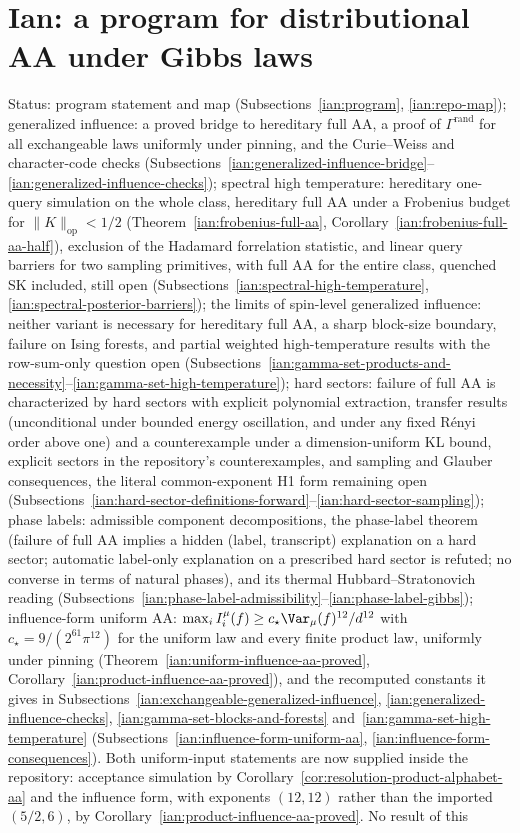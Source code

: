 \section{Ian: a program for distributional AA under Gibbs laws}\label{ian:section}

Status: program statement and map (Subsections~\ref{ian:program}, \ref{ian:repo-map}); generalized influence: a proved bridge to hereditary full AA, a proof of \(\Gamma^{\mathrm{rand}}\) for all exchangeable laws uniformly under pinning, and the Curie--Weiss and character-code checks (Subsections~\ref{ian:generalized-influence-bridge}--\ref{ian:generalized-influence-checks}); spectral high temperature: hereditary one-query simulation on the whole class, hereditary full AA under a Frobenius budget for \(\|K\|_{\mathrm{op}}<1/2\) (Theorem~\ref{ian:frobenius-full-aa}, Corollary~\ref{ian:frobenius-full-aa-half}), exclusion of the Hadamard forrelation statistic, and linear query barriers for two sampling primitives, with full AA for the entire class, quenched SK included, still open (Subsections~\ref{ian:spectral-high-temperature}, \ref{ian:spectral-posterior-barriers}); the limits of spin-level generalized influence: neither variant is necessary for hereditary full AA, a sharp block-size boundary, failure on Ising forests, and partial weighted high-temperature results with the row-sum-only question open (Subsections~\ref{ian:gamma-set-products-and-necessity}--\ref{ian:gamma-set-high-temperature}); hard sectors: failure of full AA is characterized by hard sectors with explicit polynomial extraction, transfer results (unconditional under bounded energy oscillation, and under any fixed R\'enyi order above one) and a counterexample under a dimension-uniform KL bound, explicit sectors in the repository's counterexamples, and sampling and Glauber consequences, the literal common-exponent H1 form remaining open (Subsections~\ref{ian:hard-sector-definitions-forward}--\ref{ian:hard-sector-sampling}); phase labels: admissible component decompositions, the phase-label theorem (failure of full AA implies a hidden (label, transcript) explanation on a hard sector; automatic label-only explanation on a prescribed hard sector is refuted; no converse in terms of natural phases), and its thermal Hubbard--Stratonovich reading (Subsections~\ref{ian:phase-label-admissibility}--\ref{ian:phase-label-gibbs}); influence-form uniform AA: \(\max_iI_i^\mu(f)\ge c_\star\Var_\mu(f)^{12}/d^{12}\) with \(c_\star=9/(2^{61}\pi^{12})\) for the uniform law and every finite product law, uniformly under pinning (Theorem~\ref{ian:uniform-influence-aa-proved}, Corollary~\ref{ian:product-influence-aa-proved}), and the recomputed constants it gives in Subsections~\ref{ian:exchangeable-generalized-influence}, \ref{ian:generalized-influence-checks}, \ref{ian:gamma-set-blocks-and-forests} and~\ref{ian:gamma-set-high-temperature} (Subsections~\ref{ian:influence-form-uniform-aa}, \ref{ian:influence-form-consequences}). Both uniform-input statements are now supplied inside the repository: acceptance simulation by Corollary~\ref{cor:resolution-product-alphabet-aa} and the influence form, with exponents \((12,12)\) rather than the imported \((5/2,6)\), by Corollary~\ref{ian:product-influence-aa-proved}. No result of this 